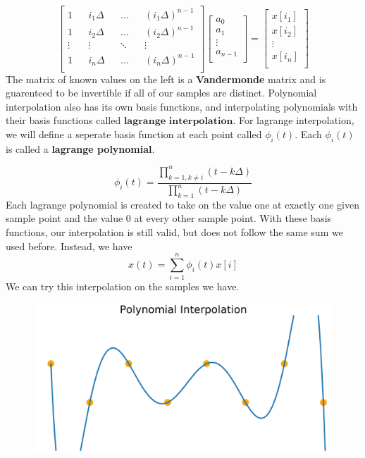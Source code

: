\begin{equation*}
\begin{bmatrix}
1 && i_1 \Delta && \dots && (i_1 \Delta)^{n-1} \\
1 && i_2 \Delta && \dots && (i_2 \Delta)^{n-1} \\
\vdots && \vdots && \ddots && \vdots  \\
1 && i_n \Delta && \dots && (i_n \Delta)^{n-1} \\
\end{bmatrix}
\begin{bmatrix}
a_0 \\
a_1 \\
\vdots \\
a_{n-1} \\
\end{bmatrix}
=
\begin{bmatrix}
x[i_1] \\
x[i_2] \\
\vdots \\
x[i_n] \\
\end{bmatrix}
\end{equation*}
The matrix of known values on the left is a \textbf{Vandermonde} matrix and is guarenteed to be invertible if all of our samples are distinct.
\newline
Polynomial interpolation also has its own basis functions, and interpolating polynomials with their basis functions called $\textbf{lagrange interpolation}$. For lagrange interpolation, we will define a seperate basis function at each point called $\phi_i(t)$. Each $\phi_i(t)$ is called a \textbf{lagrange polynomial}.

\begin{equation*}
    \phi_i(t) = \frac{\prod_{k=1, k \neq i}^{n} (t - k\Delta)}{\prod_{k=1}^{n}(t - k\Delta)}
\end{equation*}
Each lagrange polynomial is created to take on the value one at exactly one given sample point and the value 0 at every other sample point.
\newline
With these basis functions, our interpolation is still valid, but does not follow the same sum we used before. Instead, we have
\begin{equation*}
    x(t) = \sum_{i = 1}^{n} \phi_i(t) x[i]
\end{equation*}
We can try this interpolation on the samples we have.

\begin{figure}[H]
\centering
\includegraphics[width=.8\textwidth]{figures/poly_interp}
\end{figure}

